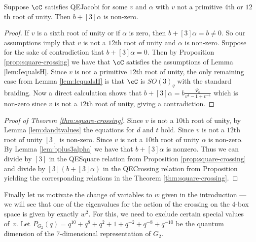 \documentclass[12pt]{amsart}
\begin{document}
\begin{lemma} \label{lem:bplus3alpha}
Suppose $\cC$ satisfies QEJacobi for some $v$ and $\alpha$ with $v$ not a
primitive $4$th or $12$th root of unity. Then $b+[3]\alpha$ is
non-zero.
\end{lemma}
\begin{proof}
If $v$ is a sixth root of unity or if $\alpha$ is zero, then $b+[3]\alpha = b \neq 0$.  So our
assumptions imply that $v$ is not a $12$th root of unity and $\alpha$ is non-zero.
Suppose for the sake of contradiction that $b+[3]\alpha = 0$.  Then by Proposition
\ref{prop:square-crossing} we have that $\cC$ satisfies the assumptions of
Lemma \ref{lem:IequalsH}.  Since $v$ is not a primitive $12$th root of unity, the only
remaining case from Lemma \ref{lem:IequalsH} is that $\cC$ is $SO(3)_q$ with
the standard braiding.  Now a direct calculation shows that $b+[3] \alpha = b
\frac{\Psi_6}{v^4-1+v^{-4}}$ which is non-zero since $v$ is not a
$12$th root of unity, giving a contradiction.
\end{proof}


\begin{proof}[Proof of Theorem \ref{thm:square-crossing}]
Since $v$ is not a $10$th root of unity, by Lemma \ref{lem:dandtvalues} the
equations for $d$ and $t$ hold.  Since $v$ is not a $12$th root of unity $[3]$
is non-zero.  Since $v$ is not a $10$th root of unity $\alpha$ is non-zero.
By Lemma \ref{lem:bplus3alpha} we have that $b+[3]\alpha$ is
nonzero.  Thus we can divide by $[3]$ in the QESquare relation from
Proposition \ref{prop:square-crossing} and divide by $[3](b+[3]\alpha)$ in the
QECrossing relation from Proposition yielding the corresponding relations in
the Theorem \ref{thm:square-crossing}.
\end{proof}


Finally let us motivate the change of variables to $w$ given in the
introduction --- we will see that one of the eigenvalues for the action of
the crossing on the $4$-box space is given by exactly $w^2$.
For this, we need to exclude certain special values of~$v$.
Let $P_{G_2}(q) = q^{10}+q^{8}+q^{2}+1+q^{-2}+q^{-8}+q^{-10}$ be the quantum
dimension of the $7$-dimensional representation of $G_2$.
\end{document}
